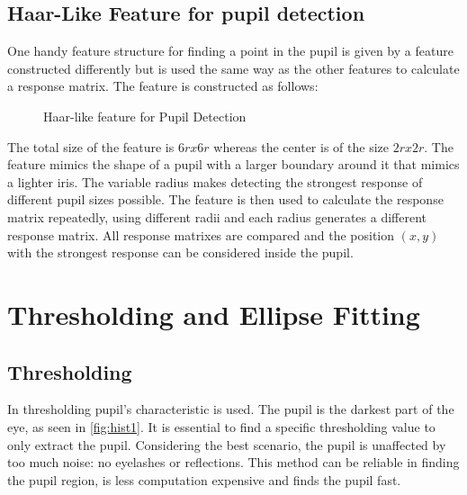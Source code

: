 \subsection{Haar-Like Feature for pupil detection }
One handy feature structure \cite{swirski_robust_2012} for finding a point in the pupil is given by a feature constructed differently but is used the same way as the other features to calculate a response matrix. The feature is constructed as follows: 
\begin{figure}[h]
    \centering
\label{fig:haar_pupil}
\caption{Haar-like feature for Pupil Detection}
\end{figure}
The total size of the feature is $6rx6r$ whereas the center is of the size $2rx2r$. The feature mimics the shape of a pupil with a larger boundary around it that mimics a lighter iris. The variable radius makes detecting the strongest response of different pupil sizes possible. The feature is then used to calculate the response matrix repeatedly, using different radii and each radius generates a different response matrix. All response matrixes are compared and the position $(x,y)$ with the strongest response can be considered inside the pupil.

\section{Thresholding and Ellipse Fitting}
\subsection{Thresholding}
In thresholding pupil's characteristic is used. The pupil is the darkest part of the eye, as seen in \ref{fig:hist1}. It is essential to find a specific thresholding value to only extract the pupil. Considering the best scenario, the pupil is unaffected by too much noise: no eyelashes or reflections. This method can be reliable in finding the pupil region, is less computation expensive and finds the pupil fast. 

